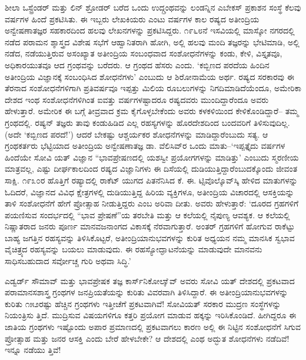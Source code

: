 ಶೀಲಾ ಒಸ್ಟ್ರೆಂಡರ್ ಮತ್ತು ಲಿನ್ ಶ್ರೋಡರ್ ಬರೆದ ಒಂದು ಉದ್ಗ್ರಂಥವನ್ನು ಲಂಡನ್ನಿನ ಎಬೇಕಸ್ ಪ್ರಕಾಶನ ಸಂಸ್ಥೆ ಕೆಲವು ವರ್ಷಗಳ ಹಿಂದೆ ಪ್ರಕಟಿಸಿತು. ಈ ಇಬ್ಬರು ಲೇಖಕಿಯರು ಎಂಟು ವರ್ಷಗಳ ಕಾಲ ರಷ್ಯದ ಅತೀಂದ್ರಿಯ ಅನ್ವೇಷಣಾತಜ್ಞರ ಸಹಕಾರದಿಂದ ಹಲವು ಲೇಖನಗಳನ್ನು ಪ್ರಕಟಿಸಿದ್ದರು. ೧೯೬೮ನೆ ಇಸವಿಯಲ್ಲಿ ಮಾಸ್ಕೋ ನಗರದಲ್ಲಿ ನಡೆದ ಪರಾಮನ ಶ್ಶಾಸ್ತ್ರದ ವಿಶೇಷ ಸಭೆಗೆ ಆಹ್ವಾನಿತರಾಗಿ ಹೋಗಿ, ಅಲ್ಲಿ ಹಲವು ಮಂದಿ ತಜ್ಞರನ್ನು ಭೇಟಿಮಾಡಿ, ಅಲ್ಲಿ ನಡೆದ, ನಡೆಯುತ್ತಿರುವ ಅಸಂಖ್ಯಾತ ಅತೀಂದ್ರಿಯ ಸಂಬಂಧವಾದ ಸಂಶೋಧನೆಗಳನ್ನು ಕಂಡು, ಕೇಳಿ, ವಿಸ್ತೃತವೂ, ಅಧಿಕಾರಯುತವೂ ಆದ ಗ್ರಂಥವನ್ನು ಬರೆದರು. ಆ ಗ್ರಂಥದ ಹೆಸರು  ಎಂದು. ‘ಕಬ್ಬಿಣದ ಪರದೆಯ ಹಿಂದಿನ ಅತೀಂದ್ರಿಯ ವಿಜ್ಞಾನಕ್ಕೆ ಸಂಬಂಧಿಸಿದ ಶೋಧನೆಗಳು’ ಎಂಬುದು ಆ ಶಿರೋನಾಮೆಯ ಅರ್ಥ. ರಷ್ಯದ ಸರಕಾರವು ಈ ತೆರನಾದ ಸಂಶೋಧನೆಗಳಿಗಾಗಿ ಪ್ರತಿವರ್ಷವೂ ಇಪ್ಪತ್ತು ಮಿಲಿಯ ರೂಬಲುಗಳನ್ನು ನಿಗದಿಮಾಡಿದೆಯೆಂದೂ, ಅಮೇರಿಕಾ ದೇಶದ ಇಂಥ ಸಂಶೋಧನೆಗಳಿಗಿಂತ ಐವತ್ತು ವರ್ಷಗಳಷ್ಟಾದರೂ ರಷ್ಯದವರು ಮುಂದಿದ್ದಾರೆಂದೂ ಅವರು ಹೇಳುತ್ತಾರೆ. ಅಮೇರಿಕ ಈ ಬಗ್ಗೆ ತೀವ್ರವಾದ ಕ್ರಮ ಕೈಗೊಳ್ಳಬೇಕೆಂದು ಅವರು ಕಳಕಳಿಯಿಂದ ಕೇಳಿಕೊಂಡಿದ್ದಾರೆ– ತಮ್ಮ ಗ್ರಂಥದಲ್ಲಿ. ರಷ್ಯನ್ ತಜ್ಞರು ತಾವು ಕಂಡುಹಿಡಿದ ಎಲ್ಲ ರಹಸ್ಯಗಳನ್ನು ಹೊರದೇಶದಿಂದ ಬಂದವರಿಗೆ ತಿಳಿಸುವುದಿಲ್ಲ. (ಅದೇ ‘ಕಬ್ಬಿಣದ ಪರದೆ!’) ಆದರೆ ಬೇಕಷ್ಟು ಆಶ್ಚರ್ಯಕರ ಶೋಧನೆಗಳನ್ನು ಮಾಡಿದ್ದಾರೆಂಬುದು ಸತ್ಯ. ಆ ಗ್ರಂಥಕರ್ತರು ಭೆಟ್ಟಿಯಾದ ಅತೀಂದ್ರಿಯ ಅನ್ವೇಷಣಾತಜ್ಞ ಡಾ. ವೆಲಿಸಿವ್​ರ ಒಂದು ಮಾತು–‘ಇಪ್ಪತ್ತೈದು ವರ್ಷಗಳ ಹಿಂದೆಯೇ ಸೋವಿ ಯತ್ ವಿಜ್ಞಾನ “ಭಾವಪ್ರೇಷಣದಲ್ಲಿ ಯಶಸ್ವೀ ಪ್ರಯೋಗಗಳನ್ನು ಮಾಡಿತ್ತು’ ಎಂಬುದು ಸ್ಮರಣೀಯ ಮಾತ್ರವಲ್ಲ, ಎಷ್ಟು ದೀರ್ಘಕಾಲದಿಂದ ರಷ್ಯದ ವಿಜ್ಞಾನಿಗಳು ಈ ದಿಸೆಯಲ್ಲಿ ದುಡಿಯುತ್ತಿದ್ದಾರೆಂಬುದಕ್ಕೊಂದು ಜೀವಂತ ಸಾಕ್ಷಿ. ೧೯೩೦ರ ಹೊತ್ತಿಗೆ ರಷ್ಯಾದಲ್ಲಿ ರಾಕೆಟ್ ಯುಗದ ಪಿತನೆನಿಸಿದ ಕೆ. ಈ. ಟ್ಸಿವೊಲ್ಕೊವ್​ಸ್ಕಿ ಹೇಳಿದ ಮಾತುಗಳನ್ನು ಓದಿದರೆ, ವಿಜ್ಞಾನದ ವಿವಿಧ ಕ್ಷೇತ್ರಗಳಲ್ಲಿ ದುಡಿಯುತ್ತಿದ್ದ ಹಿರಿಯ ವ್ಯಕ್ತಿಗಳೂ, ಅತೀಂದ್ರಿಯ ವಿಚಾರದಲ್ಲಿ ಆಸಕ್ತಿಯನ್ನು ತಾಳಿ ಸಂಶೋಧನೆಗೆ ಹೇಗೆ ಪ್ರೋತ್ಸಾಹ ನೀಡುತ್ತಿದ್ದರು ಎಂಬ ಅರಿವಾ ದೀತು. ಅವರು ಹೇಳುತ್ತಾರೆ: ‘ದೂರದ ಗ್ರಹಗಳಿಗೆ ಪಯಣಿಸುವ ಸಂದರ್ಭದಲ್ಲಿ “ಭಾವ ಪ್ರೇಷಣೆ”ಯ ತರಬೇತಿ ಮತ್ತು ಆ ಕಲೆಯಲ್ಲಿ ನೈಪುಣ್ಯ ಆವಶ್ಯಕ. ಆ ಕಲೆಯಲ್ಲಿ ನಿಷ್ಣಾತರಾದ ಜನರು ಪೂರ್ಣ ಮಾನವಜನಾಂಗದ ವಿಕಾಸಕ್ಕೆ ನೆರವಾಗುತ್ತಾರೆ. ಅಂತರ್ ಗ್ರಹಗಳಿಗೆ ಹೋಗುವ ರಾಕೆಟ್ಟು ಬಾಹ್ಯ ಜಗತ್ತಿನ ರಹಸ್ಯವನ್ನು ತಿಳಿಸಿಕೊಟ್ಟರೆ, ಅತೀಂದ್ರಿಯಾನುಭವಗಳನ್ನು ಕುರಿತ ಅಧ್ಯಯನ ನಮ್ಮ ಮಾನಸಿಕ ಸ್ವಭಾವ ವೈಚಿತ್ರ್ಯದ ರಹಸ್ಯವನ್ನು ಬಯಲು ಮಾಡುವುದು. ಈ ರಹಸ್ಯೋದ್ಘಾಟನೆಯನ್ನು ಮಾಡುವುದೇ ಮಾನವನು ಸಾಧಿಸಬಹುದಾದ ಸರ್ವೋಚ್ಚ ಗುರಿ ಅಥವಾ ಸಿದ್ಧಿ.’

ಎಡ್ವರ್ಡ್ ಸೌಮಾವ್ ಮತ್ತು ಭಾವಪ್ರೇಷಕ ತಜ್ಞ ಕಾರ್ಸ್​ನಿಕೋಲಾೈವ್ ಅವರು ಸೋವಿ ಯತ್ ದೇಶದಲ್ಲಿ ಪ್ರಕಟವಾದ ಪರಾಮಾನಸಶಾಸ್ತ್ರ ಗ್ರಂಥಗಳ ಜನಪ್ರಿಯತೆಯನ್ನು ಕುರಿತು ವಿವರವಾಗಿ ತಿಳಿಸಿದ್ದಾರೆ. ಈ ಅತೀಂದ್ರಿಯಾನುಭವಗಳನ್ನು ಕುರಿತು ೧೫೨ರಷ್ಟು ಹೆಚ್ಚಿನ ಗ್ರಂಥಗಳು ಇತ್ತೀಚೆಗೆ ಪ್ರಕಟವಾಗಿವೆ! ಸೋವಿಯತ್ ಸರಕಾರ ಮುದ್ರಣ ಸಂಸ್ಥೆಗಳನ್ನು ನಿಯಂತ್ರಿಸು ತ್ತಿದೆ. ಮುದ್ರಿಸುವ ವಿಷಯಗಳಿಗೂ ಕತ್ತರಿ ಪ್ರಯೋಗ ಮಾಡುವ ಹಕ್ಕನ್ನು ಇರಿಸಿಕೊಂಡಿದೆ. ಹೀಗಿದ್ದರೂ ಈ ಜಾತಿಯ ಗ್ರಂಥಗಳು ಇಷ್ಟೊಂದು ಅಪಾರ ಪ್ರಮಾಣದಲ್ಲಿ ಪ್ರಕಟವಾಗಲು ಕಾರಣ ಅಲ್ಲಿ ಈ ನಿಟ್ಟಿನ ಸಂಶೋಧನೆಗೆ ಸಿಗುವ ಪ್ರೋತ್ಸಾಹ ಮತ್ತು ಜನರ ಆಸಕ್ತಿ ಎಂದು ಬೇರೆ ಹೇಳಬೇಕೇ? ಆ ದೇಶದಲ್ಲಿ ಎಂಥ ಅದ್ಭುತ ಶೋಧನೆಗಳು ನಡೆದಿವೆ! ಇನ್ನೂ ನಡೆಯು ತ್ತಿವೆ!


